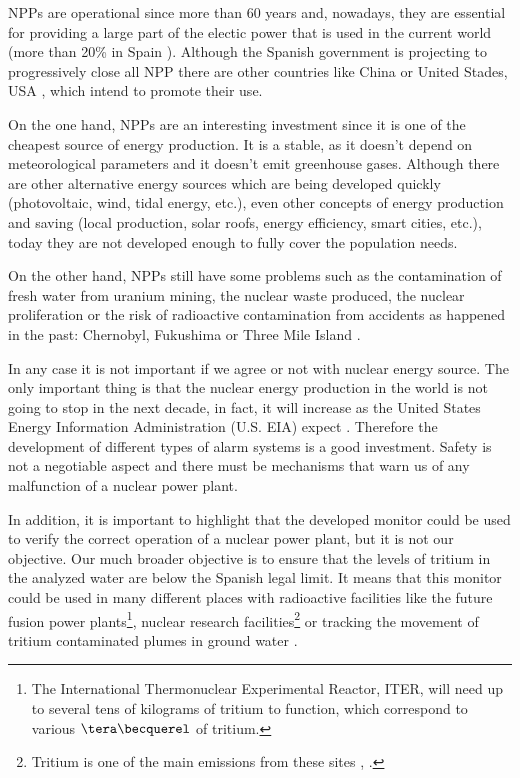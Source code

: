 NPPs are operational since more than 60 years and, nowadays, they are essential for providing a large part of the electic power that is used in the current world (more than 20\% in Spain \cite{PercentageEnergySpain}). Although the Spanish government is projecting to progressively close all NPP there are other countries like China \cite{60ReactorsChina} or United Stades, USA \cite{35MillionsUSA}, which intend to promote their use.

On the one hand, NPPs are an interesting investment since it is one of the cheapest source of energy production. It is a stable, as it doesn't depend on  meteorological parameters and it doesn't emit greenhouse gases. Although there are other alternative energy sources which are being developed quickly  (photovoltaic, wind, tidal energy, etc.), even other concepts of energy production and saving (local production, solar roofs, energy efficiency, smart cities, etc.), today they are not developed enough to fully cover the population needs.  

On the other hand, NPPs still have some problems such as the contamination of fresh water from uranium mining, the nuclear waste produced, the nuclear proliferation or the risk of radioactive contamination from accidents as happened in the past: Chernobyl, Fukushima or Three Mile Island \cite{ThreeMileIsland}.

In any case it is not important if we agree or not with nuclear energy source. The only important thing is that the nuclear energy production in the world is not going to stop in the next decade, in fact, it will increase as the United States Energy Information Administration (U.S. EIA) expect \cite{EIAOutlook}. Therefore the development of  different types of alarm systems is a good investment. Safety is not a negotiable aspect and there must be mechanisms that warn us of any malfunction of a nuclear power plant. 

In addition, it is important to highlight that the developed monitor could be used to verify the correct operation of a nuclear power plant, but it is not our objective. Our much broader objective is to ensure that the levels of tritium in the analyzed water are below the Spanish legal limit. It means that this monitor could be used in many different places with radioactive facilities like the future fusion power plants\footnote{The International Thermonuclear Experimental Reactor, ITER, will need up to several tens of kilograms of tritium to function, which correspond to various $\tera\becquerel$ of tritium.}, nuclear research facilities\footnote{Tritium is one of the main emissions from these sites \cite{FERMILAB}, \cite{BrookHavenNationalLaboratory}.} or tracking the movement of tritium contaminated plumes in ground water \cite{TrackingTritium}. 

